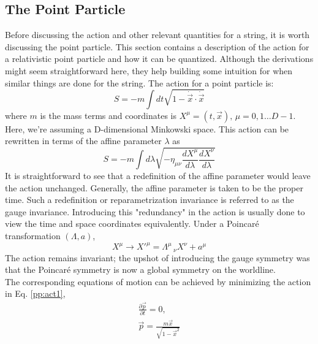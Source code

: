 \documentclass{article}
\begin{document}
\subsection{The Point Particle}
Before discussing the action and other relevant quantities for a string, it is worth discussing the point particle. This section contains a description of the action for a relativistic point particle and how it can be quantized. Although the derivations might seem straightforward here, they help building some intuition for when similar things are done for the string. The action for a point particle is:
\begin{equation}
    S = -m\int dt\sqrt{1-\dot{\vec{x}}\cdot \dot{\vec{x}}}\label{pp:act1}
\end{equation}
where $m$ is the mass terms and coordinates is $X^\mu=(t,\vec{x}), \,\mu=0,1\dots D-1$. Here, we're assuming a D-dimensional Minkowski space. This action can be rewritten in terms of the affine parameter $\lambda$ as 
\begin{equation}
    S = -m\int d\lambda \sqrt{-\eta_{\mu\nu}\frac{dX^\mu}{d\lambda}\frac{dX^\nu}{d\lambda}} \label{pp:act2}
\end{equation}
It is straightforward to see that a redefinition of the affine parameter would leave the action unchanged. Generally, the affine parameter is taken to be the proper time. Such a redefinition or reparametrization invariance is referred to as the gauge invariance. Introducing this "redundancy" in the action is usually done to view the time and space coordinates equivalently. Under a Poincar\'e transformation $(\Lambda,a)$,
\begin{equation}
    X^\mu \xrightarrow{} X'^\mu = \Lambda^\mu\,_\nu X^\nu + a^\mu
\end{equation}
The action remains invariant; the upshot of introducing the gauge symmetry was that the Poincar\'e symmetry is now a global symmetry on the worldline.\\
The corresponding equations of motion can be achieved by minimizing the action in Eq. \eqref{pp:act1},
\begin{align}
    \frac{\partial \vec{p}}{\partial t} = 0,\\
    \vec{p} = \frac{m\vec{x}}{\sqrt{1-\vec{x}^2}}
\end{align}
\end{document}
